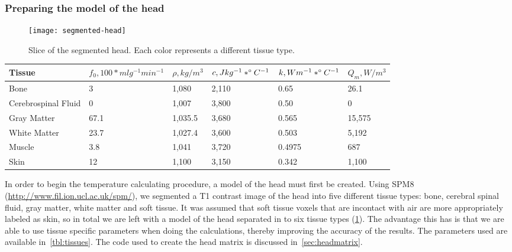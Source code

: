     \subsubsection{Preparing the model of the head}
    \begin{figure}[tb] 
      \centering \hspace*{20px} 
    	\texttt{[image: segmented-head]} 
    	\caption{\label{fig:segmented} Slice of the segmented head. Each color represents a different tissue type.} 
    \end{figure}
    \begin{table*}[tb] 
      \caption[Tissue-specific parameters]{\label{tbl:tissues} Tissue-specific parameters used to calculate the temperature change (from~\citet{collins}).} 
      \vspace{10pt}
    		\begin{tabular*}{\linewidth}{llllll} 
    		  \toprule
    		  Tissue & $f_0, 100*ml g^{-1} min^{-1}$ & $\rho, kg/m^{3}$ & $c, J kg^{-1}*^\circ C^{-1}$ & $k, W m^{-1}*^\circ C^{-1}$ & $Q_{m}, W/m^{3}$ \\
    		  \midrule
    			Bone & 3 & 1,080 & 2,110 & 0.65 & 26.1 \\
    			Cerebrospinal Fluid & 0 & 1,007 & 3,800 & 0.50 & 0 \\
    			Gray Matter & 67.1 & 1,035.5 & 3,680 & 0.565 & 15,575 \\
    			White Matter & 23.7 & 1,027.4 & 3,600 & 0.503 & 5,192 \\
    			Muscle & 3.8 & 1,041 & 3,720 & 0.4975 & 687 \\
    			Skin & 12 & 1,100 & 3,150 & 0.342 & 1,100 \\
    			\bottomrule
    		\end{tabular*}
    \end{table*}
  In order to begin the temperature calculating procedure, a model of the head must first be created.  Using SPM8 (\url{http://www.fil.ion.ucl.ac.uk/spm/}), we segmented a T1 contrast image of the head into five different tissue types: bone, cerebral spinal fluid, gray matter, white matter and soft tissue.  It was assumed that soft tissue voxels that are incontact with air are more appropriately labeled as skin, so in total we are left with a model of the head separated in to six tissue types (\cref{fig:segmented}).  The advantage this has is that we are able to use tissue specific parameters when doing the calculations, thereby improving the accuracy of the results.  The parameters used are available in~\cref{tbl:tissues}.  The code used to create the head matrix is discussed in~\cref{sec:headmatrix}.

